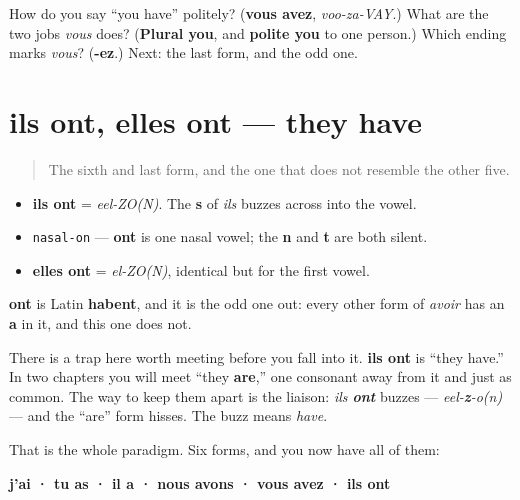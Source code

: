 \begin{tcolorbox}[breakable,colback=teal!4,colframe=teal!35!black,title={Before you move on}]
How do you say \textquotedblleft{}you have\textquotedblright{} politely? (\textbf{vous avez}, \emph{voo-za-VAY}.) What are the two jobs \emph{vous} does? (\textbf{Plural you}, and \textbf{polite you} to one person.) Which ending marks \emph{vous}? (\textbf{-ez}.) Next: the last form, and the odd one.
\end{tcolorbox}
\section[ils ont, elles ont]{ils ont, elles ont — they have}

\label{lesson:FR-C14-ont}



\begin{quote}
The sixth and last form, and the one that does not resemble the other five.
\end{quote}

\begin{sounds}
\begin{itemize}
\raggedright
  \item \textbf{ils ont} = \emph{eel-ZO(N)}. The \textbf{s} of \emph{ils} buzzes across into the vowel.
  \item \texttt{nasal-on} — \textbf{ont} is one nasal vowel; the \textbf{n} and \textbf{t} are both silent.
  \item \textbf{elles ont} = \emph{el-ZO(N)}, identical but for the first vowel.
\end{itemize}
\end{sounds}

\begin{cousinweb}
\textbf{ont} is Latin \textbf{habent}, and it is the odd one out: every other form of \emph{avoir} has an \textbf{a} in it, and this one does not.

There is a trap here worth meeting before you fall into it. \textbf{ils ont} is \textquotedblleft{}they have.\textquotedblright{} In two chapters you will meet \textquotedblleft{}they \textbf{are},\textquotedblright{} one consonant away from it and just as common. The way to keep them apart is the liaison: \emph{ils \textbf{ont}} buzzes — \emph{eel-\textbf{z}-o(n)} — and the \textquotedblleft{}are\textquotedblright{} form hisses. The buzz means \emph{have}.

That is the whole paradigm. Six forms, and you now have all of them:

\textbf{j'ai · tu as · il a · nous avons · vous avez · ils ont}
\end{cousinweb}

